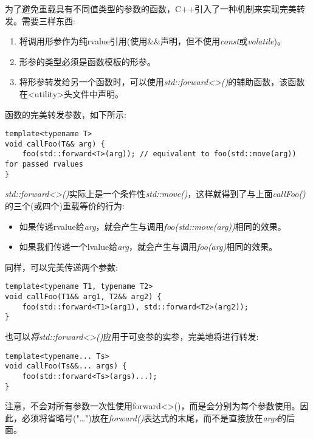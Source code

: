 为了避免重载具有不同值类型的参数的函数，C++引入了一种机制来实现完美转发。需要三样东西:\par

\begin{enumerate}
	\item 将调用形参作为纯rvalue引用(使用\&\&声明，但不使用\textit{const}或\textit{volatile})。
	\item 形参的类型必须是函数模板的形参。
	\item 将形参转发给另一个函数时，可以使用\textit{std::forward<>()}的辅助函数，该函数在<utility>头文件中声明。
\end{enumerate}

函数的完美转发参数，如下所示:\par

\begin{lstlisting}[caption={}]
template<typename T>
void callFoo(T&& arg) {
	foo(std::forward<T>(arg)); // equivalent to foo(std::move(arg)) for passed rvalues
}
\end{lstlisting}

\textit{std::forward<>()}实际上是一个条件性\textit{std::move()}，这样就得到了与上面\textit{callFoo()}的三个(或四个)重载等价的行为:

\begin{itemize}
	\item 如果传递rvalue给\textit{arg}，就会产生与调用\textit{foo(std::move(arg))}相同的效果。
	\item 如果我们传递一个lvalue给\textit{arg}，就会产生与调用\textit{foo(arg)}相同的效果。
\end{itemize}

同样，可以完美传递两个参数:\par

\begin{lstlisting}[caption={}]
template<typename T1, typename T2>
void callFoo(T1&& arg1, T2&& arg2) {
	foo(std::forward<T1>(arg1), std::forward<T2>(arg2));
}
\end{lstlisting}

也可以\textit{将std::forward<>()}应用于可变参的实参，完美地将进行转发:\par

\begin{lstlisting}[caption={}]
template<typename... Ts>
void callFoo(Ts&&... args) {
	foo(std::forward<Ts>(args)...);
}
\end{lstlisting}

注意，不会对所有参数一次性使用forward<>()，而是会分别为每个参数使用。因此，必须将省略号("…")放在\textit{forward()}表达式的末尾，而不是直接放在\textit{args}的后面。\par

